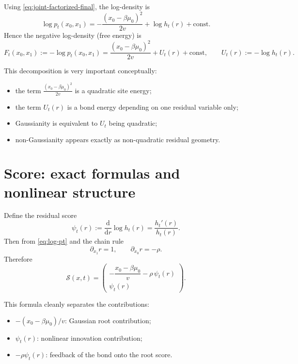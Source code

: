 \documentclass[11pt]{article}
\newcommand{\dd}{\mathrm{d}}
\newcommand{\1}{\mathbf{1}}
\newcommand{\pt}{p_t}
\newcommand{\score}{\mathcal{S}}
\theoremstyle{definition}
\begin{document}
Using \eqref{eq:joint-factorized-final}, the log-density is
\begin{equation}
\label{eq:log-pt}
\log \pt(x_0,x_1)
=
-\frac{(x_0-\beta\mu_0)^2}{2v} + \log h_t(r) + \text{const}.
\end{equation}
Hence the negative log-density (free energy) is
\begin{equation}
\label{eq:free-energy}
F_t(x_0,x_1):=-\log \pt(x_0,x_1)
=
\frac{(x_0-\beta\mu_0)^2}{2v} + U_t(r) + \text{const},
\qquad
U_t(r):=-\log h_t(r).
\end{equation}

This decomposition is very important conceptually:
\begin{itemize}[leftmargin=2em]
    \item the term \(\frac{(x_0-\beta\mu_0)^2}{2v}\) is a quadratic site energy;
    \item the term \(U_t(r)\) is a bond energy depending on one residual variable only;
    \item Gaussianity is equivalent to \(U_t\) being quadratic;
    \item non-Gaussianity appears exactly as non-quadratic residual geometry.
\end{itemize}

\section{Score: exact formulas and nonlinear structure}

Define the residual score
\begin{equation}
\label{eq:psi-definition}
\psi_t(r):=\frac{\dd}{\dd r}\log h_t(r)=\frac{h_t'(r)}{h_t(r)}.
\end{equation}
Then from \eqref{eq:log-pt} and the chain rule
\begin{equation}
\partial_{x_1}r=1,
\qquad
\partial_{x_0}r=-\rho.
\end{equation}
Therefore
\begin{equation}
\label{eq:score-final}
\boxed{
\score(x,t)=
\begin{pmatrix}
-\dfrac{x_0-\beta\mu_0}{v} - \rho\, \psi_t(r)\\[0.8em]
\psi_t(r)
\end{pmatrix}.
}
\end{equation}

This formula cleanly separates the contributions:
\begin{itemize}[leftmargin=2em]
    \item \( -(x_0-\beta\mu_0)/v \): Gaussian root contribution;
    \item \( \psi_t(r) \): nonlinear innovation contribution;
    \item \( -\rho\psi_t(r) \): feedback of the bond onto the root score.
\end{itemize}
\end{document}
